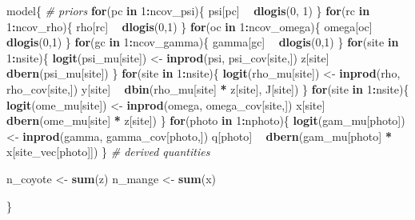 \documentclass[
]{article}
\newenvironment{Shaded}{\begin{snugshade}}{\end{snugshade}}
\newcommand{\CommentTok}[1]{\textcolor[rgb]{0.56,0.35,0.01}{\textit{#1}}}
\newcommand{\ControlFlowTok}[1]{\textcolor[rgb]{0.13,0.29,0.53}{\textbf{#1}}}
\newcommand{\DecValTok}[1]{\textcolor[rgb]{0.00,0.00,0.81}{#1}}
\newcommand{\KeywordTok}[1]{\textcolor[rgb]{0.13,0.29,0.53}{\textbf{#1}}}
\newcommand{\NormalTok}[1]{#1}
\newcommand{\OperatorTok}[1]{\textcolor[rgb]{0.81,0.36,0.00}{\textbf{#1}}}
\newcommand{\StringTok}[1]{\textcolor[rgb]{0.31,0.60,0.02}{#1}}
\begin{document}
\begin{Shaded}
\begin{Highlighting}[]
\NormalTok{model\{}
  \CommentTok{# priors}
  \ControlFlowTok{for}\NormalTok{(pc }\ControlFlowTok{in} \DecValTok{1}\OperatorTok{:}\NormalTok{ncov_psi)\{}
\NormalTok{    psi[pc] }\OperatorTok{~}\StringTok{ }\KeywordTok{dlogis}\NormalTok{(}\DecValTok{0}\NormalTok{, }\DecValTok{1}\NormalTok{)}
\NormalTok{  \}}
  \ControlFlowTok{for}\NormalTok{(rc }\ControlFlowTok{in} \DecValTok{1}\OperatorTok{:}\NormalTok{ncov_rho)\{}
\NormalTok{    rho[rc] }\OperatorTok{~}\StringTok{ }\KeywordTok{dlogis}\NormalTok{(}\DecValTok{0}\NormalTok{,}\DecValTok{1}\NormalTok{)}
\NormalTok{  \}}
  \ControlFlowTok{for}\NormalTok{(oc }\ControlFlowTok{in} \DecValTok{1}\OperatorTok{:}\NormalTok{ncov_omega)\{}
\NormalTok{    omega[oc] }\OperatorTok{~}\StringTok{ }\KeywordTok{dlogis}\NormalTok{(}\DecValTok{0}\NormalTok{,}\DecValTok{1}\NormalTok{)}
\NormalTok{  \}}
  \ControlFlowTok{for}\NormalTok{(gc }\ControlFlowTok{in} \DecValTok{1}\OperatorTok{:}\NormalTok{ncov_gamma)\{}
\NormalTok{    gamma[gc] }\OperatorTok{~}\StringTok{ }\KeywordTok{dlogis}\NormalTok{(}\DecValTok{0}\NormalTok{,}\DecValTok{1}\NormalTok{)}
\NormalTok{  \}}
  \ControlFlowTok{for}\NormalTok{(site }\ControlFlowTok{in} \DecValTok{1}\OperatorTok{:}\NormalTok{nsite)\{}
    \KeywordTok{logit}\NormalTok{(psi_mu[site]) <-}\StringTok{ }\KeywordTok{inprod}\NormalTok{(psi, psi_cov[site,])}
\NormalTok{    z[site] }\OperatorTok{~}\StringTok{ }\KeywordTok{dbern}\NormalTok{(psi_mu[site])}
\NormalTok{  \}}
  \ControlFlowTok{for}\NormalTok{(site }\ControlFlowTok{in} \DecValTok{1}\OperatorTok{:}\NormalTok{nsite)\{}
    \KeywordTok{logit}\NormalTok{(rho_mu[site]) <-}\StringTok{ }\KeywordTok{inprod}\NormalTok{(rho, rho_cov[site,])}
\NormalTok{    y[site] }\OperatorTok{~}\StringTok{ }\KeywordTok{dbin}\NormalTok{(rho_mu[site] }\OperatorTok{*}\StringTok{ }\NormalTok{z[site], J[site])}
\NormalTok{  \}}
  \ControlFlowTok{for}\NormalTok{(site }\ControlFlowTok{in} \DecValTok{1}\OperatorTok{:}\NormalTok{nsite)\{}
    \KeywordTok{logit}\NormalTok{(ome_mu[site]) <-}\StringTok{ }\KeywordTok{inprod}\NormalTok{(omega, omega_cov[site,])}
\NormalTok{    x[site] }\OperatorTok{~}\StringTok{ }\KeywordTok{dbern}\NormalTok{(ome_mu[site] }\OperatorTok{*}\StringTok{ }\NormalTok{z[site])}
\NormalTok{  \}}
  \ControlFlowTok{for}\NormalTok{(photo }\ControlFlowTok{in} \DecValTok{1}\OperatorTok{:}\NormalTok{nphoto)\{}
    \KeywordTok{logit}\NormalTok{(gam_mu[photo]) <-}\StringTok{ }\KeywordTok{inprod}\NormalTok{(gamma, gamma_cov[photo,])}
\NormalTok{    q[photo] }\OperatorTok{~}\StringTok{ }\KeywordTok{dbern}\NormalTok{(gam_mu[photo] }\OperatorTok{*}\StringTok{ }\NormalTok{x[site_vec[photo]])}
\NormalTok{  \}}
  \CommentTok{# derived quantities}

\NormalTok{    n_coyote <-}\StringTok{ }\KeywordTok{sum}\NormalTok{(z)}
\NormalTok{    n_mange <-}\StringTok{  }\KeywordTok{sum}\NormalTok{(x)}

\NormalTok{\}}
\end{Highlighting}
\end{Shaded}
\end{document}
